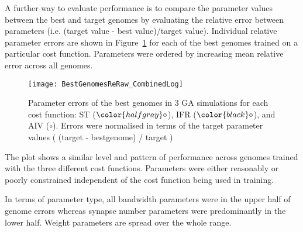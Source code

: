 A further way to evaluate {\GA} performance is to compare the parameter values
between the best and target genomes by evaluating the relative error
between parameters (i.e. (target value - best value)/target value). Individual 
relative parameter errors are shown in Figure~\ref{fig:GA:R2} for
each of the best genomes trained on a particular cost function. Parameters
were ordered by increasing mean relative error across all genomes.

\smallskip{}

\begin{figure}[th!]
  \centering
  \texttt{[image: BestGenomesReRaw\_CombinedLog]}
  \caption{Parameter errors of the best genomes in 3 {GA}
    simulations for each cost function: ST (${\color{halfgray} \diamond }$), IFR (${\color{black} \diamond }$), and AIV (${\circ}$). Errors were normalised in terms
    of the target parameter values ( (target - bestgenome) / target )}\label{fig:GA:R2}
\end{figure}


The plot shows a similar level and pattern of performance across
genomes trained with the three different cost functions. Parameters were
either reasonably or poorly constrained independent of the cost function
being used in training.

\smallskip{}

In terms of parameter type, all bandwidth parameters were in the upper half
of genome errors whereas synapse number parameters were predominantly in
the lower half.  Weight parameters are spread over the whole range.


% 




